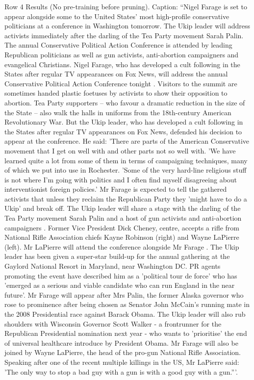 \begin{table}[H]
\centering
\caption{Row 4 Results (No pre-training before pruning). \ifshowcaption{}Caption: ``Nigel Farage is set to appear alongside some to the United States' most high-profile conservative politicians at a conference in Washington tomorrow. The Ukip leader will address activists immediately after the darling of the Tea Party movement Sarah Palin. The annual Conservative Political Action Conference is attended by leading Republican politicians as well as gun activists, anti-abortion campaigners and evangelical Christians. Nigel Farage, who has developed a cult following in the States after regular TV appearances on Fox News, will address the annual Conservative Political Action Conference tonight . Visitors to the summit are sometimes handed plastic foetuses by activists to show their opposition to abortion. Tea Party supporters – who favour a dramatic reduction in the size of the State – also walk the halls in uniforms from the 18th-century American Revolutionary War. But the Ukip leader, who has developed a cult following in the States after regular TV appearances on Fox News, defended his decision to appear at the conference. He said: 'There are parts of the American Conservative movement that I get on well with and other parts not so well with. 'We have learned quite a lot from some of them in terms of campaigning techniques, many of which we put into use in Rochester. 'Some of the very hard-line religious stuff is not where I'm going with politics and I often find myself disagreeing about interventionist foreign policies.' Mr Farage is expected to tell the gathered activists that unless they reclaim the Republican Party they 'might have to do a Ukip' and break off. The Ukip leader will share a stage with the darling of the Tea Party movement Sarah Palin and a host of gun activists and anti-abortion campaigners . Former Vice President Dick Cheney, centre, accepts a rifle from National Rifle Association chiefs Kayne Robinson (right) and Wayne LaPierre (left). Mr LaPierre will attend the conference alongside Mr Farage . The Ukip leader has been given a super-star build-up for the annual gathering at the Gaylord National Resort in Maryland, near Washington DC. PR agents promoting the event have described him as a 'political tour de force' who has 'emerged as a serious and viable candidate who can run England in the near future'. Mr Farage will appear after Mrs Palin, the former Alaska governor who rose to prominence after being chosen as Senator John McCain's running mate in the 2008 Presidential race against Barack Obama. The Ukip leader will also rub shoulders with Wisconsin Governor Scott Walker - a frontrunner for the Republican Presidential nomination next year - who wants to 'prioritise' the end of universal healthcare introduce by President Obama. Mr Farage will also be joined by Wayne LaPierre, the head of the pro-gun National Rifle Association. Speaking after one of the recent multiple killings in the US, Mr LaPierre said: 'The only way to stop a bad guy with a gun is with a good guy with a gun.'''.\fi}

\end{table}
